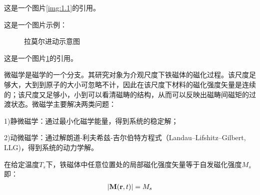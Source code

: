 	这是一个图片\ref{img:1.1}的引用。
	
	这是一个图片示例：
	
	\begin{figure}[htbp]
		\centering
		\caption{拉莫尔进动示意图} \label{img:1.2}
	\end{figure}

	这是一个图片\ref{img:1.2}的引用。
	
	微磁学是磁学的一个分支。其研究对象为介观尺度下铁磁体的磁化过程。该尺度足够大，大到到原子的大小可忽略不计，因此在该尺度下材料的磁化强度矢量是连续的；该尺度又足够小，小到可以看清磁畴的结构，从而可以反映出磁畴间磁矩的过渡状态。微磁学主要解决两类问题：
	
	1)静微磁学：通过最小化磁学能量，得到系统的稳定解；
	
	2)动微磁学：通过解朗道-利夫希兹-吉尔伯特方程式（Landau–Lifshitz–Gilbert, LLG)，得到系统的动力学解。
	
	在给定温度$ T_s $下，铁磁体中任意位置处的局部磁化强度矢量等于自发磁化强度$ M_s $即：
	\begin{align}
	|{\bf{M}}({\bf{r}},t)| = {M_s}
	\end{align}	
	
